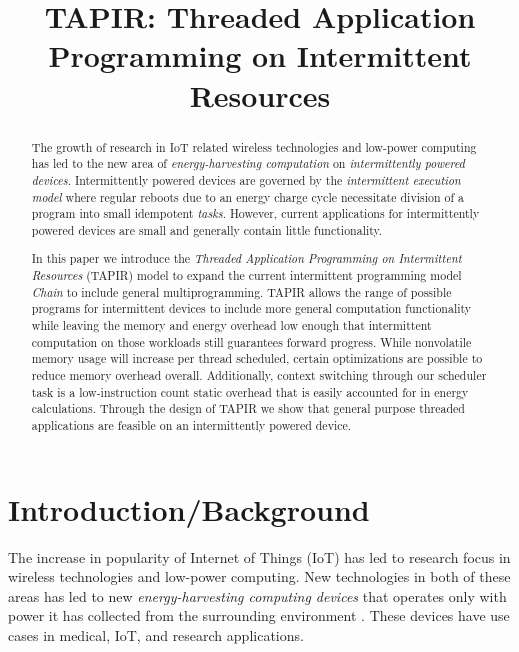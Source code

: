 \documentclass[11pt]{sensys-proc}
\title{TAPIR: Threaded Application Programming on Intermittent Resources}
\begin{document}
\maketitle

\begin{abstract}
The growth of research in IoT related wireless technologies and low-power computing
has led to the new area of \textit{energy-harvesting computation} on \textit{intermittently
powered devices}. Intermittently powered devices are governed by the \textit{intermittent
execution model} where regular reboots due to an energy charge cycle necessitate division
of a program into small idempotent \textit{tasks}. However, current applications for
intermittently powered devices are small and generally contain little functionality.

In this paper we introduce the \textit{Threaded Application Programming on Intermittent Resources}
(TAPIR) model to expand the current intermittent programming model \textit{Chain} to
include general multiprogramming. TAPIR allows the range of possible programs for
intermittent devices to include more general computation functionality while leaving the
memory and energy overhead low enough that intermittent computation on those workloads
still guarantees forward progress. While nonvolatile memory usage will increase per thread
scheduled, certain optimizations are possible to reduce memory overhead overall. Additionally,
context switching through our scheduler task is a low-instruction count static overhead that is
easily accounted for in energy calculations. Through the design of TAPIR we show that general
purpose threaded applications are feasible on an intermittently powered device.
\end{abstract}


\section{Introduction/Background}
  \label{sec:intro}

The increase in popularity of Internet of Things (IoT) has led to research focus
in wireless technologies and low-power computing.  New technologies in both of
these areas has led to new \textit{energy-harvesting computing devices} that
operates only with power it has collected from the surrounding environment
\cite{Chain}. These devices have use cases in medical, IoT, and research
applications.
\end{document}
